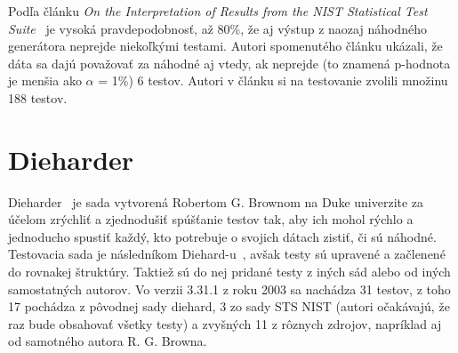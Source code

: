Podľa článku \textit{On the Interpretation of Results from the NIST Statistical Test Suite}~\parencite{nist-sts-interpretation-syso} je vysoká pravdepodobnosť, až 80\%, že aj výstup z naozaj náhodného generátora neprejde niekoľkými testami. Autori spomenutého článku ukázali, že dáta sa dajú považovať za náhodné aj vtedy, ak neprejde (to znamená p-hodnota je menšia ako $\alpha$ = 1\%) 6 testov. Autori v článku si na testovanie zvolili množinu 188 testov.

\section{Dieharder}
\label{sec:dieharder}
Dieharder~\parencite{dieharder} je sada vytvorená Robertom G. Brownom na Duke univerzite za účelom zrýchliť a zjednodušiť spúšťanie testov tak, aby ich mohol rýchlo a jednoducho spustiť každý, kto potrebuje o svojich dátach zistiť, či sú náhodné. Testovacia sada je následníkom Diehard-u~\parencite{diehard}, avšak testy sú upravené a začlenené do rovnakej štruktúry. Taktiež sú do nej pridané testy z iných sád alebo od iných samostatných autorov. Vo verzii 3.31.1 z roku 2003 sa nachádza 31 testov, z toho 17 pochádza z pôvodnej sady diehard, 3 zo sady STS NIST (autori očakávajú, že raz bude obsahovať všetky testy) a zvyšných 11 z rôznych zdrojov, napríklad aj od samotného autora R. G. Browna.

